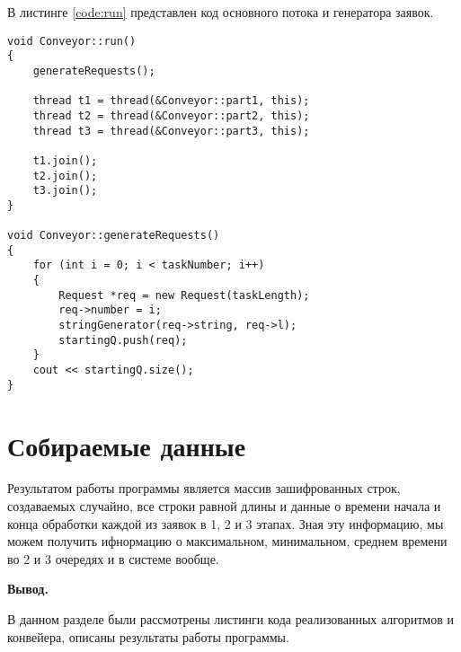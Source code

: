 \par В листинге \ref{code:run} представлен код основного потока и генератора заявок.
\begin{lstlisting}[caption= Третий этап выполнения конвейера, label=code:run]
void Conveyor::run()
{
	generateRequests();
	
	thread t1 = thread(&Conveyor::part1, this);
	thread t2 = thread(&Conveyor::part2, this);
	thread t3 = thread(&Conveyor::part3, this);
	
	t1.join();
	t2.join();
	t3.join();
}

void Conveyor::generateRequests()
{
	for (int i = 0; i < taskNumber; i++)
	{
		Request *req = new Request(taskLength);
		req->number = i;
		stringGenerator(req->string, req->l);
		startingQ.push(req);
	}
	cout << startingQ.size();
}
\end{lstlisting}

\section{Собираемые данные}
\label{sec:tests}
Результатом работы программы является массив зашифрованных строк, создаваемых случайно, все строки равной длины и данные о времени начала и конца обработки каждой из заявок в 1, 2 и 3 этапах. Зная эту информацию, мы можем получить ифнормацию о максимальном, минимальном, среднем времени во 2 и 3 очередях и в системе вообще.

\par\textbf{Вывод.}
\par В данном разделе были рассмотрены листинги кода реализованных алгоритмов и конвейера, описаны результаты работы программы.